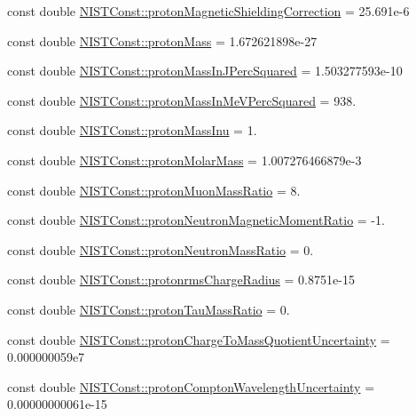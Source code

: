 \begin{DoxyCompactItemize}
\item 
const double \hyperlink{group___n_i_s_t_const-_proton_ga401cef12f93ba64cca44703bbdb516e7}{N\+I\+S\+T\+Const\+::proton\+Magnetic\+Shielding\+Correction} = 25.\+691e-\/6
\item 
const double \hyperlink{group___n_i_s_t_const-_proton_gaa6738785a6bf04323231318dd6b2ed90}{N\+I\+S\+T\+Const\+::proton\+Mass} = 1.\+672621898e-\/27
\item 
const double \hyperlink{group___n_i_s_t_const-_proton_gae46a62aa4ccd40b74db6a45a3933cf0f}{N\+I\+S\+T\+Const\+::proton\+Mass\+In\+J\+Perc\+Squared} = 1.\+503277593e-\/10
\item 
const double \hyperlink{group___n_i_s_t_const-_proton_gad2f4fab753bd216193f8c31ced93d46d}{N\+I\+S\+T\+Const\+::proton\+Mass\+In\+Me\+V\+Perc\+Squared} = 938.
\item 
const double \hyperlink{group___n_i_s_t_const-_proton_gaf2a9916164fce50112bd8bbe8b712e5a}{N\+I\+S\+T\+Const\+::proton\+Mass\+Inu} = 1.
\item 
const double \hyperlink{group___n_i_s_t_const-_proton_ga8a29760b90301104dbd9512674eccc4c}{N\+I\+S\+T\+Const\+::proton\+Molar\+Mass} = 1.\+007276466879e-\/3
\item 
const double \hyperlink{group___n_i_s_t_const-_proton_gab9c5458c70434c20a8527661c4ff0b73}{N\+I\+S\+T\+Const\+::proton\+Muon\+Mass\+Ratio} = 8.
\item 
const double \hyperlink{group___n_i_s_t_const-_proton_ga349fed5e91e8d7f8d71ba45405da64e7}{N\+I\+S\+T\+Const\+::proton\+Neutron\+Magnetic\+Moment\+Ratio} = -\/1.
\item 
const double \hyperlink{group___n_i_s_t_const-_proton_ga8b54a81cc7dec7f196f874dcc81dbab2}{N\+I\+S\+T\+Const\+::proton\+Neutron\+Mass\+Ratio} = 0.
\item 
const double \hyperlink{group___n_i_s_t_const-_proton_gadc726e50679ce96f2d6c0e84c378998e}{N\+I\+S\+T\+Const\+::protonrms\+Charge\+Radius} = 0.\+8751e-\/15
\item 
const double \hyperlink{group___n_i_s_t_const-_proton_ga6b8624fb113601433f311bb5d3423115}{N\+I\+S\+T\+Const\+::proton\+Tau\+Mass\+Ratio} = 0.
\item 
const double \hyperlink{group___n_i_s_t_const-_proton_ga5040619a0a4a6ebd0d96e4bf6740a083}{N\+I\+S\+T\+Const\+::proton\+Charge\+To\+Mass\+Quotient\+Uncertainty} = 0.\+000000059e7
\item 
const double \hyperlink{group___n_i_s_t_const-_proton_gacd9d26e2857b120b9b875843afd3d04e}{N\+I\+S\+T\+Const\+::proton\+Compton\+Wavelength\+Uncertainty} = 0.\+00000000061e-\/15

\end{DoxyCompactItemize}
